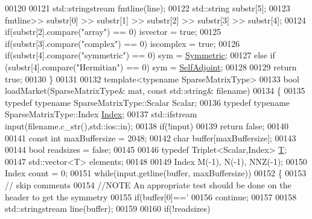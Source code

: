 \begin{DoxyCode}
{00120   
00121   std::stringstream fmtline(line); 
00122   std::string substr[5];
00123   fmtline>> substr[0] >> substr[1] >> substr[2] >> substr[3] >> substr[4];
00124   \textcolor{keywordflow}{if}(substr[2].compare(\textcolor{stringliteral}{"array"}) == 0) isvector = \textcolor{keyword}{true};
00125   \textcolor{keywordflow}{if}(substr[3].compare(\textcolor{stringliteral}{"complex"}) == 0) iscomplex = \textcolor{keyword}{true};
00126   \textcolor{keywordflow}{if}(substr[4].compare(\textcolor{stringliteral}{"symmetric"}) == 0) sym = \hyperlink{group__enums_gga39e3366ff5554d731e7dc8bb642f83cda7d30fb969ef6b763c098f0015108cef4}{Symmetric};
00127   \textcolor{keywordflow}{else} \textcolor{keywordflow}{if} (substr[4].compare(\textcolor{stringliteral}{"Hermitian"}) == 0) sym = \hyperlink{group__enums_gga39e3366ff5554d731e7dc8bb642f83cda2491fc6765056421f504eb7e16083e8f}{SelfAdjoint};
00128   
00129   \textcolor{keywordflow}{return} \textcolor{keyword}{true};
00130 \}
00131   
00132 \textcolor{keyword}{template}<\textcolor{keyword}{typename} SparseMatrixType>
00133 \textcolor{keywordtype}{bool} loadMarket(SparseMatrixType& mat, \textcolor{keyword}{const} std::string& filename)
00134 \{
00135   \textcolor{keyword}{typedef} \textcolor{keyword}{typename} SparseMatrixType::Scalar Scalar;
00136   \textcolor{keyword}{typedef} \textcolor{keyword}{typename} SparseMatrixType::Index \hyperlink{namespace_eigen_a62e77e0933482dafde8fe197d9a2cfde}{Index};
00137   std::ifstream input(filename.c\_str(),std::ios::in);
00138   \textcolor{keywordflow}{if}(!input)
00139     \textcolor{keywordflow}{return} \textcolor{keyword}{false};
00140   
00141   \textcolor{keyword}{const} \textcolor{keywordtype}{int} maxBuffersize = 2048;
00142   \textcolor{keywordtype}{char} buffer[maxBuffersize];
00143   
00144   \textcolor{keywordtype}{bool} readsizes = \textcolor{keyword}{false};
00145 
00146   \textcolor{keyword}{typedef} Triplet<Scalar,Index> \hyperlink{group___sparse_core___module_class_eigen_1_1_triplet}{T};
00147   std::vector<T> elements;
00148   
00149   Index M(-1), N(-1), NNZ(-1);
00150   Index count = 0;
00151   \textcolor{keywordflow}{while}(input.getline(buffer, maxBuffersize))
00152   \{
00153     \textcolor{comment}{// skip comments   }
00154     \textcolor{comment}{//NOTE An appropriate test should be done on the header to get the  symmetry}
00155     \textcolor{keywordflow}{if}(buffer[0]==\textcolor{charliteral}{'%
00156       \textcolor{keywordflow}{continue};
00157     
00158     std::stringstream line(buffer);
00159     
00160     \textcolor{keywordflow}{if}(!readsizes)
}}
\end{DoxyCode}
